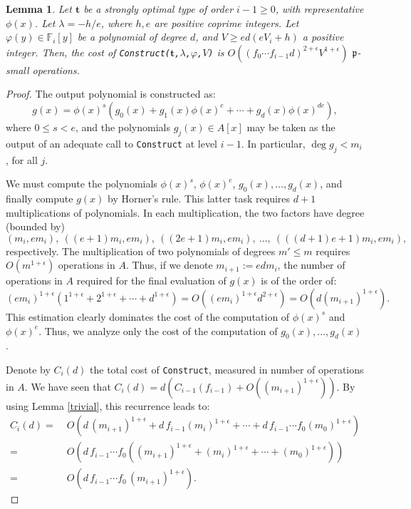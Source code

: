 \documentclass{amsart}
\newtheorem{lemma}[theorem]{Lemma}
\begin{document}
\begin{lemma}\label{Construct}
Let ${\mathbf{t}}$ be a strongly optimal type of order $i-1\ge0$, with representative $\phi(x)$. Let $\lambda=-h/e$, where  $h,e$ are positive coprime integers.
Let $\varphi(y)\in {\mathbb F}_i[y]$ be a polynomial of degree $d$, and $V\ge ed(eV_{i}+h)$ a positive integer.
Then, the cost of {\tt Construct(${\mathbf{t}}$,$\lambda$,$\varphi$,$V$)} is $O\left((f_0\cdots f_{i-1}d)^{2+\epsilon}V^{1+\epsilon}\right)$ ${\mathfrak{p}}$-small operations.
\end{lemma}

\begin{proof}
The output polynomial is constructed as: 
$$
g(x)=\phi(x)^s\left(g_0(x)+g_1(x)\phi(x)^{e}+\cdots+g_d(x)\phi(x)^{de}\right),
$$
where $0\le s<e$, and the polynomials $g_j(x)\in A[x]$ may be taken as the output of an adequate call to {\tt Construct} at level $i-1$. In particular, $\deg g_j<m_i$, for all $j$.  

We must compute the polynomials $\phi(x)^s$, $\phi(x)^{e}$, $g_0(x),\dots,g_d(x)$, and finally compute $g(x)$ by Horner's rule. This latter task requires $d+1$ multiplications of polynomials. In each multiplication, the two factors have degree (bounded by) $$(m_i,em_i), \ ((e+1)m_i,em_i),\ ((2e+1)m_i,em_i),\ \dots,\ (((d+1)e+1)m_i,em_i),$$
respectively. The multiplication of two polynomials of degrees $m'\le m$ requires $O(m^{1+\epsilon})$ operations in $A$. Thus, if we denote $m_{i+1}:=edm_i$, the number of operations in $A$ required for the final evaluation of $g(x)$ is of the order of:
$$(em_i)^{1+\epsilon}(1^{1+\epsilon}+2^{1+\epsilon}+\cdots+d^{1+\epsilon})=O((em_i)^{1+\epsilon}d^{2+\epsilon})=O(d(m_{i+1})^{1+\epsilon}).
$$
This estimation clearly dominates the cost of the computation of $\phi(x)^s$ and $\phi(x)^{e}$. Thus, we analyze only the cost of the computation of $g_0(x),\dots,g_d(x)$. 

Denote by $C_i(d)$ the total cost of {\tt Construct}, measured in number of operations in $A$.
We have seen that $C_i(d)=d\left(C_{i-1}(f_{i-1})+O((m_{i+1})^{1+\epsilon})\right)$. By using Lemma \ref{trivial}, this recurrence leads to:
\begin{equation}\label{estfast}
\begin{aligned}
C_i(d)=&\;O\left(d\,(m_{i+1})^{1+\epsilon}+d\,f_{i-1}(m_i)^{1+\epsilon}+\cdots+d\,f_{i-1}\cdots f_0(m_0)^{1+\epsilon}\right)\\=&\;O\left(d\,f_{i-1}\cdots f_0\left((m_{i+1})^{1+\epsilon}+(m_i)^{1+\epsilon}+\cdots+(m_0)^{1+\epsilon}\right)\right)\\=&\;O\left(d\,f_{i-1}\cdots f_0\,(m_{i+1})^{1+\epsilon}\right).
\end{aligned} 
\end{equation}


\end{proof}
\end{document}
